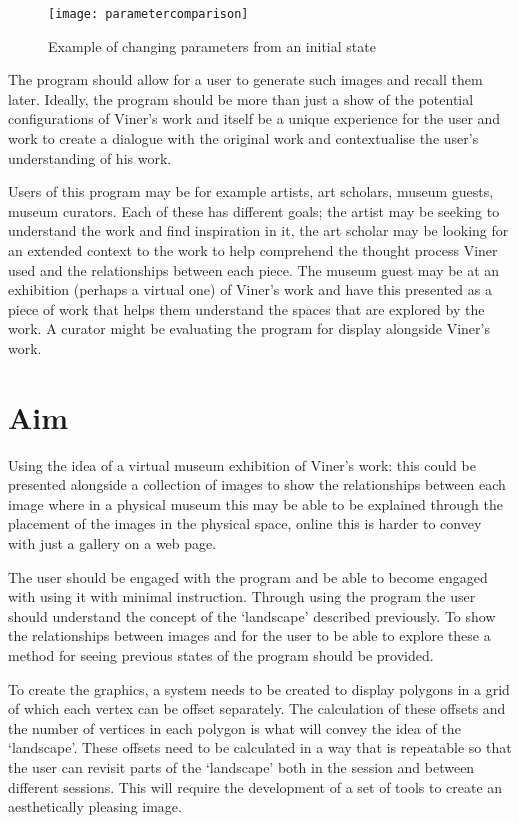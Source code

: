 \begin{figure}[H]
    \texttt{[image: parametercomparison]}
    \caption{Example of changing parameters from an initial state}
\end{figure}

The program should allow for a user to generate such images and recall them
later. Ideally, the program should be more than just a show of the potential
configurations of Viner's work and itself be a unique experience for the user
and work to create a dialogue with the original work and contextualise the
user's understanding of his work.

Users of this program may be for example artists, art scholars, museum guests,
museum curators. Each of these has different goals; the artist may be seeking
to understand the work and find inspiration in it, the art scholar may be
looking for an extended context to the work to help comprehend the thought
process Viner used and the relationships between each piece. The museum guest may be
at an exhibition (perhaps a virtual one) of Viner's work and have this presented
as a piece of work that helps them understand the spaces that are explored by
the work. A curator might be evaluating the program for display alongside
Viner's work.

\section{Aim}
Using the idea of a virtual museum exhibition of Viner's work: this could be
presented alongside a collection of images to show the relationships between
each image where in a physical museum this may be able to be explained through
the placement of the images in the physical space, online this is harder to
convey with just a gallery on a web page.

The user should be engaged with the program and be able to become engaged with
using it with minimal instruction. Through using the program the user should
understand the concept of the `landscape' described previously. To show the
relationships between images and for the user to be able to explore these a
method for seeing previous states of the program should be provided.

To create the graphics, a system needs to be created to display polygons in a
grid of which each vertex can be offset separately. The calculation of these
offsets and the number of vertices in each polygon is what will convey the idea
of the `landscape'. These offsets need to be calculated in a way that is
repeatable so that the user can revisit parts of the `landscape' both in the
session and between different sessions. This will require the development of a
set of tools to create an aesthetically pleasing image.

